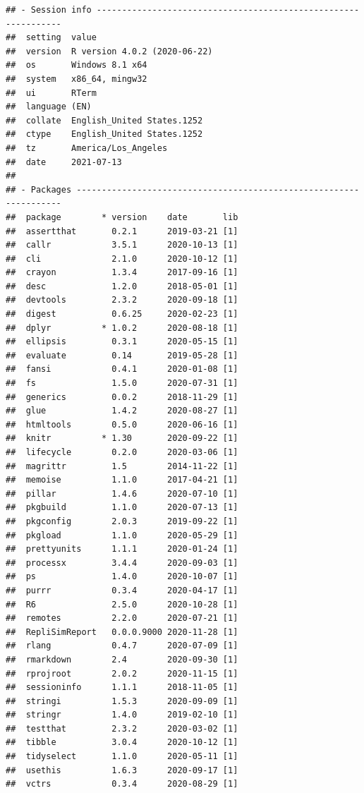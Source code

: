 \documentclass[10,a4paperpaper,]{article}
\begin{document}
\begin{verbatim}
## - Session info ---------------------------------------------------------------
##  setting  value                       
##  version  R version 4.0.2 (2020-06-22)
##  os       Windows 8.1 x64             
##  system   x86_64, mingw32             
##  ui       RTerm                       
##  language (EN)                        
##  collate  English_United States.1252  
##  ctype    English_United States.1252  
##  tz       America/Los_Angeles         
##  date     2021-07-13                  
## 
## - Packages -------------------------------------------------------------------
##  package        * version    date       lib
##  assertthat       0.2.1      2019-03-21 [1]
##  callr            3.5.1      2020-10-13 [1]
##  cli              2.1.0      2020-10-12 [1]
##  crayon           1.3.4      2017-09-16 [1]
##  desc             1.2.0      2018-05-01 [1]
##  devtools         2.3.2      2020-09-18 [1]
##  digest           0.6.25     2020-02-23 [1]
##  dplyr          * 1.0.2      2020-08-18 [1]
##  ellipsis         0.3.1      2020-05-15 [1]
##  evaluate         0.14       2019-05-28 [1]
##  fansi            0.4.1      2020-01-08 [1]
##  fs               1.5.0      2020-07-31 [1]
##  generics         0.0.2      2018-11-29 [1]
##  glue             1.4.2      2020-08-27 [1]
##  htmltools        0.5.0      2020-06-16 [1]
##  knitr          * 1.30       2020-09-22 [1]
##  lifecycle        0.2.0      2020-03-06 [1]
##  magrittr         1.5        2014-11-22 [1]
##  memoise          1.1.0      2017-04-21 [1]
##  pillar           1.4.6      2020-07-10 [1]
##  pkgbuild         1.1.0      2020-07-13 [1]
##  pkgconfig        2.0.3      2019-09-22 [1]
##  pkgload          1.1.0      2020-05-29 [1]
##  prettyunits      1.1.1      2020-01-24 [1]
##  processx         3.4.4      2020-09-03 [1]
##  ps               1.4.0      2020-10-07 [1]
##  purrr            0.3.4      2020-04-17 [1]
##  R6               2.5.0      2020-10-28 [1]
##  remotes          2.2.0      2020-07-21 [1]
##  RepliSimReport   0.0.0.9000 2020-11-28 [1]
##  rlang            0.4.7      2020-07-09 [1]
##  rmarkdown        2.4        2020-09-30 [1]
##  rprojroot        2.0.2      2020-11-15 [1]
##  sessioninfo      1.1.1      2018-11-05 [1]
##  stringi          1.5.3      2020-09-09 [1]
##  stringr          1.4.0      2019-02-10 [1]
##  testthat         2.3.2      2020-03-02 [1]
##  tibble           3.0.4      2020-10-12 [1]
##  tidyselect       1.1.0      2020-05-11 [1]
##  usethis          1.6.3      2020-09-17 [1]
##  vctrs            0.3.4      2020-08-29 [1]

\end{verbatim}
\end{document}
